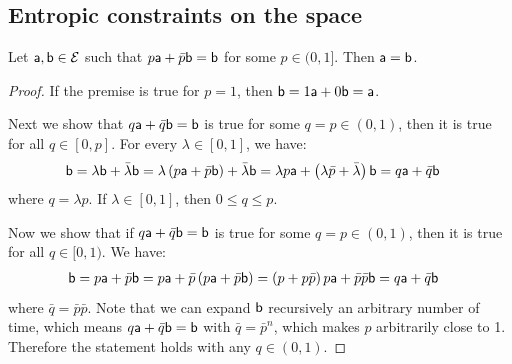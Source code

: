 \subsection{Entropic constraints on the space}

\begin{prop}
	Let $\ens[a], \ens[b] \in \Ens$ such that $p\ens[a] + \bar{p} \ens[b] = \ens[b]$ for some $p \in (0,1]$. Then $\ens[a] = \ens[b]$. 
\end{prop}

\begin{proof}
	If the premise is true for $p = 1$, then $\ens[b] = 1 \ens[a] + 0 \ens[b] = \ens[a]$.
	
	Next we show that $q\ens[a] + \bar{q} \ens[b] = \ens[b]$ is true for some $q = p \in (0,1)$, then it is true for all $q \in [0,p]$. For every $\lambda \in [0,1]$, we have:
	\begin{equation}
		\begin{aligned}
			\ens[b] &= \lambda \ens[b] + \bar{\lambda} \ens[b] = \lambda \left(p\ens[a] + \bar{p} \ens[b]\right) + \bar{\lambda} \ens[b] =  \lambda p\ens[a] + \left(\lambda \bar{p} + \bar{\lambda}\right)\ens[b] = q \ens[a] + \bar{q} \ens[b]
		\end{aligned}
	\end{equation}
	where $q = \lambda p$. If $\lambda \in [0,1]$, then $0 \leq q \leq p$.
	
	Now we show that if $q\ens[a] + \bar{q} \ens[b] = \ens[b]$ is true for some $q = p \in (0,1)$, then it is true for all $q \in [0,1)$. We have:
	\begin{equation}
		\begin{aligned}
			\ens[b] &= p\ens[a] + \bar{p} \ens[b] = p\ens[a] + \bar{p} \left(p\ens[a] + \bar{p} \ens[b]\right) = \left(p + p \bar{p}\right) p\ens[a] + \bar{p} \bar{p} \ens[b] = q \ens[a] + \bar{q} \ens[b]
		\end{aligned}
	\end{equation}
	where $\bar{q} = \bar{p} \bar{p}$. Note that we can expand $\ens[b]$ recursively an arbitrary number of time, which means $q\ens[a] + \bar{q} \ens[b] = \ens[b]$ with $\bar{q} = \bar{p}^n$, which makes $p$ arbitrarily close to 1. Therefore the statement holds with any $q \in (0,1)$.


\end{proof}
